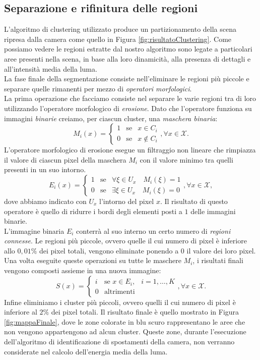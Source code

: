 \subsection{Separazione e rifinitura delle regioni}
L'algoritmo di clustering utilizzato produce un partizionamento della scena ripresa dalla camera come quello in Figura \ref{fig:risultatoClustering}.
Come possiamo vedere le regioni estratte dal nostro algoritmo sono legate a particolari aree presenti nella scena, in base alla loro dinamicit\`a, alla presenza di dettagli e all'intensit\`a media della luma.\\
La fase finale della segmentazione consiste nell'eliminare le regioni pi\`u piccole e separare quelle rimanenti per mezzo di \textit{operatori morfologici}.\\
La prima operazione che facciamo consiste nel separare le varie regioni tra di loro utilizzando l'operatore morfologico di \textit{erosione}.
Dato che l'operatore funziona su immagini \textit{binarie} creiamo, per ciascun cluster, una \textit{maschera binaria}:
\[M_i(x) =  \left\{ \begin{array}{rcl}
1 & \mbox{se} & x \in C_i \\
0 & \mbox{se} & x \notin C_i
\end{array}\right. , \forall x \in \mathcal{X}.\]
L'operatore morfologico di erosione esegue un filtraggio non lineare che rimpiazza il valore di ciascun pixel della maschera $M_i$ con il valore minimo tra quelli presenti in un suo intorno.
\[E_i(x) =  \left\{ \begin{array}{rcl}
1 & \mbox{se} & \forall \xi \in U_x \quad M_i(\xi) = 1 \\
0 & \mbox{se} & \exists \xi \in U_x \quad M_i(\xi) = 0
\end{array}\right. , \forall x \in \mathcal{X},\]
dove abbiamo indicato con $U_x$ l'intorno del pixel $x$.
Il risultato di questo operatore \`e quello di ridurre i bordi degli elementi posti a $1$ delle immagini binarie.\\
L'immagine binaria $E_i$ conterr\`a al suo interno un certo numero di \textit{regioni connesse}.
Le regioni pi\`u piccole, ovvero quelle il cui numero di pixel \`e inferiore allo $0,01\%$ dei pixel totali, vengono eliminate ponendo a $0$ il valore dei loro pixel.
Una volta eseguite queste operazioni su tutte le maschere $M_i$, i risultati finali vengono composti assieme in una nuova immagine:
\[ S(x)= \left\{ \begin{array}{rcll}
i & \mbox{se }  x \in E_i, & i=1,\dots,K \\
0 & \mbox{altrimenti} 
\end{array}\right. , \forall x \in \mathcal{X}.\]
Infine eliminiamo i cluster pi\`u piccoli, ovvero quelli il cui numero di pixel \`e inferiore al $2\%$ dei pixel totali.   
Il risultato finale \`e quello mostrato in Figura \ref{fig:mappaFinale}, dove le zone colorate in blu scuro rappresentano le aree che non vengono appartengono ad alcun cluster.
Queste zone, durante l'esecuzione dell'algoritmo di identificazione di spostamenti della camera, non verranno considerate nel calcolo dell'energia media della luma.
